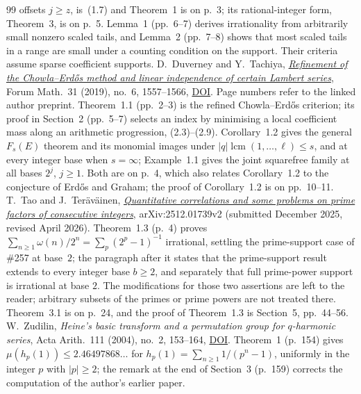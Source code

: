 \begin{thebibliography}{99}
  offsets $j\ge z$, is~(1.7) and Theorem~1 is on p.~3; its rational-integer
  form, Theorem~3, is on p.~5.  Lemma~1 (pp.~6--7) derives irrationality from
  arbitrarily small nonzero scaled tails, and Lemma~2 (pp.~7--8) shows that
  most scaled tails in a range are small under a counting condition on the
  support.  Their criteria assume sparse coefficient supports.
 D.~Duverney and Y.~Tachiya,
  \href{https://danielduverney.fr/documents/theorie-des-nombres/DuverneyTachiya190522.pdf}
  {\emph{Refinement of the Chowla--Erd\H{o}s method and linear independence
  of certain Lambert series}},
  Forum Math.\ 31 (2019), no.~6, 1557--1566,
  \href{https://doi.org/10.1515/forum-2018-0299}{DOI}.  Page numbers refer to
  the linked author preprint.  Theorem~1.1 (pp.~2--3) is the refined
  Chowla--Erd\H{o}s criterion; its proof in Section~2 (pp.~5--7) selects an
  index by minimising a local coefficient mass along an arithmetic
  progression, (2.3)--(2.9).  Corollary~1.2 gives the general $F_s(E)$
  theorem and its monomial images under $|q|\operatorname{lcm}(1,\dots,\ell)\le s$, and at
  every integer base when $s=\infty$; Example~1.1 gives the joint squarefree
  family at all bases \(2^j\), \(j\ge1\).  Both are on p.~4, which also
  relates Corollary~1.2 to the conjecture of Erd\H{o}s and Graham; the proof
  of Corollary~1.2 is on pp.~10--11.
 T.~Tao and J.~Ter\"av\"ainen,
  \href{https://arxiv.org/abs/2512.01739v2}{\emph{Quantitative correlations and
  some problems on prime factors of consecutive integers}}, arXiv:2512.01739v2
  (submitted December 2025, revised April 2026).  Theorem~1.3 (p.~4) proves
  $\sum_{n\ge1}\omega(n)/2^n=\sum_p(2^p-1)^{-1}$ irrational, settling the
  prime-support case of \#257 at base~$2$; the paragraph after it states that
  the prime-support result extends to every integer base $b\ge2$, and
  separately that full prime-power support is irrational at base $2$.
  The modifications for those two assertions are left to the reader;
  arbitrary subsets of the primes or prime powers are not treated there.  Theorem~3.1 is on p.~24, and the
  proof of Theorem~1.3 is Section~5, pp.~44--56.
 W.~Zudilin, \emph{Heine's basic transform and a
  permutation group for $q$-harmonic series}, Acta Arith.\ 111 (2004), no.~2,
  153--164, \href{https://doi.org/10.4064/aa111-2-4}{DOI}.  Theorem~1 (p.~154)
  gives $\mu(h_p(1))\le2.46497868\ldots$ for $h_p(1)=\sum_{n\ge1}1/(p^n-1)$,
  uniformly in the integer $p$ with $|p|\ge2$; the remark at the end of
  Section~3 (p.~159) corrects the computation of the author's earlier paper.

\end{thebibliography}
